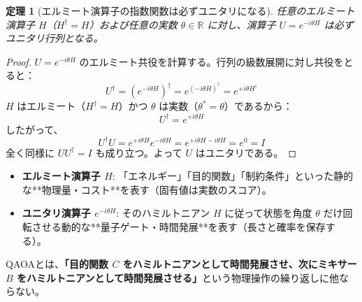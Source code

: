 \documentclass[11pt,a4paper]{ltjsarticle}
\theoremstyle{definition}
\theoremstyle{plain}
\newtheorem{theorem}{定理}[section]
\theoremstyle{remark}
\begin{document}
\begin{theorem}[エルミート演算子の指数関数は必ずユニタリになる]
任意のエルミート演算子 $H$（$H^\dagger = H$）および任意の実数 $\theta \in \mathbb{R}$ に対し、演算子 $U = e^{-i \theta H}$ は必ずユニタリ行列となる。
\end{theorem}
\begin{proof}
$U = e^{-i \theta H}$ のエルミート共役を計算する。行列の級数展開に対し共役をとると：
\begin{equation}
U^\dagger = \left( e^{-i \theta H} \right)^\dagger = e^{( -i \theta H )^\dagger} = e^{+i \theta H^\dagger}
\end{equation}
$H$ はエルミート（$H^\dagger = H$）かつ $\theta$ は実数（$\theta^* = \theta$）であるから：
\begin{equation}
U^\dagger = e^{+i \theta H}
\end{equation}
したがって、
\begin{equation}
U^\dagger U = e^{+i \theta H} e^{-i \theta H} = e^{+i \theta H - i \theta H} = e^0 = I
\end{equation}
全く同様に $U U^\dagger = I$ も成り立つ。よって $U$ はユニタリである。
\end{proof}

\begin{paperbox}
\begin{itemize}
    \item \textbf{エルミート演算子 $H$}: 「エネルギー」「目的関数」「制約条件」といった静的な**物理量・コスト**を表す（固有値は実数のスコア）。
    \item \textbf{ユニタリ演算子 $e^{-i \theta H}$}: そのハミルトニアン $H$ に従って状態を角度 $\theta$ だけ回転させる動的な**量子ゲート・時間発展**を表す（長さと確率を保存する）。
\end{itemize}
QAOAとは、\textbf{「目的関数 $C$ をハミルトニアンとして時間発展させ、次にミキサー $B$ をハミルトニアンとして時間発展させる」}という物理操作の繰り返しに他ならない。
\end{paperbox}
\end{document}
